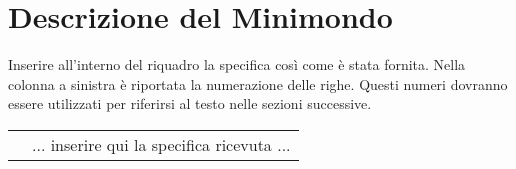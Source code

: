 \section{Descrizione del Minimondo}

\begin{templateblock}
    Inserire all’interno del riquadro la specifica così come è stata
    fornita. Nella colonna a sinistra è riportata la numerazione delle righe.
    Questi numeri dovranno essere utilizzati per riferirsi al testo nelle
    sezioni successive.
\end{templateblock}

\begin{tabularx}{\linewidth}{r|>{\internallinenumbers}X|}
    \cline{2-2} &
    ... inserire qui la specifica ricevuta ...\hfill
    \\\cline{2-2}
\end{tabularx}
